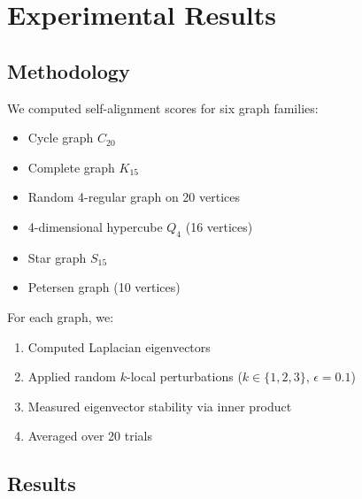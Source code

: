 \documentclass[11pt,a4paper]{article}
\theoremstyle{definition}
\theoremstyle{remark}
\begin{document}
\section{Experimental Results}
\label{sec:experiments}

\subsection{Methodology}

We computed self-alignment scores for six graph families:
\begin{itemize}
    \item Cycle graph $C_{20}$
    \item Complete graph $K_{15}$
    \item Random 4-regular graph on 20 vertices
    \item 4-dimensional hypercube $Q_4$ (16 vertices)
    \item Star graph $S_{15}$
    \item Petersen graph (10 vertices)
\end{itemize}

For each graph, we:
\begin{enumerate}
    \item Computed Laplacian eigenvectors
    \item Applied random $k$-local perturbations ($k \in \{1, 2, 3\}$, $\epsilon = 0.1$)
    \item Measured eigenvector stability via inner product
    \item Averaged over 20 trials
\end{enumerate}

\subsection{Results}
\end{document}
